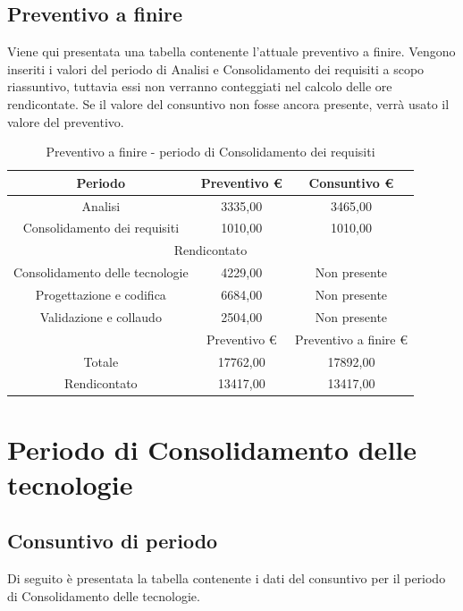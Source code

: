 \documentclass[./PianodiProgetto.tex]{subfiles}
\begin{document}
\subsection{Preventivo a finire}
Viene qui presentata una tabella contenente l'attuale preventivo a finire.
Vengono inseriti i valori del periodo di Analisi e Consolidamento dei requisiti a scopo riassuntivo, tuttavia essi non verranno conteggiati nel calcolo delle ore rendicontate. Se il valore del consuntivo non fosse ancora presente, verrà usato il valore del preventivo.

\begin{table}[H]
	\centering
	\begin{tabular}{|c|c|c|}
		\hline
		Periodo&Preventivo \euro{}&Consuntivo \euro{} \\ \hline
		Analisi&3335,00&3465,00  \\ \hline
		Consolidamento dei requisiti&1010,00&1010,00  \\ \hline
		\multicolumn{3}{|c|}{Rendicontato}  \\ \hline
		Consolidamento delle tecnologie&4229,00&Non presente  \\ \hline
		Progettazione e codifica&6684,00&Non presente  \\ \hline
		Validazione e collaudo&2504,00&Non presente  \\ \hline
		&Preventivo \euro{}&Preventivo a finire \euro{}  \\ \hline
		Totale&17762,00&17892,00 \\ \hline
		Rendicontato&13417,00&13417,00 \\ \hline
	\end{tabular}
	\caption{Preventivo a finire - periodo di Consolidamento dei requisiti}
\end{table}

\section{Periodo di Consolidamento delle tecnologie}
\subsection{Consuntivo di periodo}
Di seguito è presentata la tabella contenente i dati del consuntivo per il
periodo di Consolidamento delle tecnologie.
\end{document}
